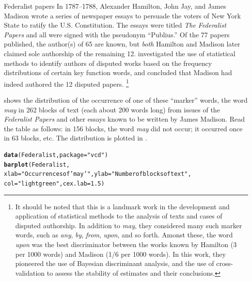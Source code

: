 \documentclass[11pt]{book}\usepackage[]{graphicx}\usepackage[]{color}
\makeatletter
\newcommand{\hlnum}[1]{\textcolor[rgb]{0.686,0.059,0.569}{#1}}%
\newcommand{\hlstr}[1]{\textcolor[rgb]{0.192,0.494,0.8}{#1}}%
\newcommand{\hlstd}[1]{\textcolor[rgb]{0.345,0.345,0.345}{#1}}%
\newcommand{\hlkwc}[1]{\textcolor[rgb]{0.333,0.667,0.333}{#1}}%
\newcommand{\hlkwd}[1]{\textcolor[rgb]{0.737,0.353,0.396}{\textbf{#1}}}%
\newenvironment{kframe}{%
 \def\at@end@of@kframe{}%
 \ifinner\ifhmode%
  \def\at@end@of@kframe{\end{minipage}}%
  \begin{minipage}{\columnwidth}%
 \fi\fi%
 \def\FrameCommand##1{\hskip\@totalleftmargin \hskip-\fboxsep
 \colorbox{shadecolor}{##1}\hskip-\fboxsep
     \hskip-\linewidth \hskip-\@totalleftmargin \hskip\columnwidth}%
 \MakeFramed {\advance\hsize-\width
   \@totalleftmargin\z@ \linewidth\hsize
   \@setminipage}}%
 {\par\unskip\endMakeFramed%
 \at@end@of@kframe}
\newenvironment{knitrout}{}{} %
\renewenvironment{knitrout}{\small\renewcommand{\baselinestretch}{.85}}{} %
\makeatother
\begin{document}
\begin{Example}[madison1]{Federalist papers}
In 1787--1788, Alexander Hamilton, John Jay, and James Madison
wrote a series of newspaper essays to persuade the voters of
New York State to ratify the U.S. Constitution.
The essays were titled \emph{The Federalist Papers}
and all were signed with the pseudonym ``Publius.''  Of the 77 papers published,
the author(s) of 65 are known, but \emph{both}
Hamilton and Madison later claimed sole authorship of the remaining 12.
\citet{MostellerWallace:63,MostellerWallace:84}
investigated the use of statistical methods to identify authors of
disputed works based on the frequency distributions of certain key
function words, and concluded that Madison had indeed authored the
12 disputed papers.%
\footnote{
It should be noted that this is a landmark work in the development and
application of statistical methods to the analysis of texts and
cases of disputed authorship. In addition to
\emph{may}, they considered many such marker words,
such as \emph{any}, \emph{by}, \emph{from}, \emph{upon}, and so forth.
Amonst these, the word \emph{upon} was the best discriminator between
the works known by Hamilton (3 per 1000 words) and Madison (1/6 per 1000 words).
In this work, they pioneered the use of Bayesian discriminant analysis,
and the use of cross-validation to assess the stability of estimates
and their conclusions.
}

 shows the distribution of the occurrence of one of
these ``marker'' words, 
the
word \emph{may} in 262 blocks of text (each about 200 words long)
from issues of the \emph{Federalist Papers} and other essays known
to be written by James Madison.  Read the table as follows:
in 156 blocks, the word \emph{may}
did not occur; it occurred once in 63 blocks, etc.  The distribution
is plotted in .


\begin{knitrout}
\color{fgcolor}\begin{kframe}
\begin{alltt}
\hlkwd{data}\hlstd{(Federalist,} \hlkwc{package}\hlstd{=}\hlstr{"vcd"}\hlstd{)}
\hlkwd{barplot}\hlstd{(Federalist,}
        \hlkwc{xlab}\hlstd{=}\hlstr{"Occurrences of 'may'"}\hlstd{,} \hlkwc{ylab}\hlstd{=}\hlstr{"Number of blocks of text"}\hlstd{,}
        \hlkwc{col}\hlstd{=}\hlstr{"lightgreen"}\hlstd{,} \hlkwc{cex.lab}\hlstd{=}\hlnum{1.5}\hlstd{)}
\end{alltt}
\end{kframe}\begin{figure}[htbp]



\end{figure}
\end{knitrout}
\end{Example}
\end{document}
